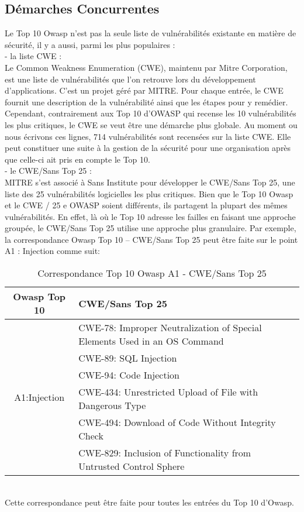 \subsection{Démarches Concurrentes}
Le Top 10 Owasp n’est pas la seule liste de vulnérabilités existante en matière de sécurité, il y a aussi, parmi les plus populaires : \\
- la liste CWE : \\
Le Common Weakness Enumeration (CWE), maintenu par Mitre Corporation, est une liste de vulnérabilités que l’on retrouve lors du développement d’applications. C'est un projet  géré par MITRE. Pour chaque entrée, le CWE fournit une description de la vulnérabilité ainsi que les étapes pour y remédier.
Cependant, contrairement aux Top 10 d’OWASP qui recense les 10 vulnérabilités les plus critiques, le CWE se veut être une démarche plus globale. Au moment ou nous écrivons ces lignes, 714 vulnérabilités sont recensées sur la liste CWE. Elle peut constituer une suite à la gestion de la sécurité pour une organisation après que celle-ci ait pris en compte le Top 10. \\
- le CWE/Sans Top 25 : \\
MITRE s'est associé à Sans Institute pour développer le CWE/Sans Top 25, une liste des 25 vulnérabilités logicielles les plus critiques. Bien que le Top 10 Owasp et le CWE / 25 e OWASP soient différents, ils partagent la plupart des mêmes vulnérabilités. En effet, là où le Top 10 adresse les failles en faisant une approche groupée, le CWE/Sans Top 25 utilise une approche plus granulaire. Par exemple, la correspondance Owasp Top 10 – CWE/Sans Top 25 peut être faite sur le point A1 : Injection comme suit:
\begin{table}[hbt!]
	\centering
	\begin{tabular}{| c | l |} 
		\hline
		Owasp Top 10 & CWE/Sans Top 25 \\
		\hline
		\multirow{6}{4em}{A1:Injection} & CWE-78: Improper Neutralization of Special Elements Used in an OS Command \\ 
		& CWE-89: SQL Injection\\ 
		& CWE-94: Code Injection\\ 
		& CWE-434: Unrestricted Upload of File with Dangerous Type\\
		& CWE-494: Download of Code Without Integrity Check\\
		& CWE-829: Inclusion of Functionality from Untrusted Control Sphere\\
		\hline
	\end{tabular}
	\caption{Correspondance Top 10 Owasp A1 - CWE/Sans Top 25}
\end{table}\\
Cette correspondance peut être faite pour toutes les entrées du Top 10 d’Owasp.
\clearpage 
